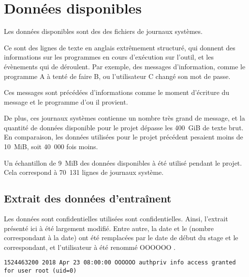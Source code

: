 \chapter{Données disponibles}\label{ch:data_papud}
Les données disponibles sont des des fichiers de journaux systèmes.

Ce sont des lignes de texte en anglais extrêmement structuré,
qui donnent des informations sur les programmes en cours d'exécution sur l'outil, et les évènements qui de déroulent.
Par exemple, des messages d'information, comme \og le programme A à tenté de faire B\fg{}, ou \og l'utilisateur C changé son mot de passe\fg{}.

Ces messages sont précédées d'informations comme le moment d'écriture du message et le programme d'ou il provient.

De plus, ces journaux systèmes contienne un nombre très grand de message, et la quantité de données disponible pour le projet dépasse les 400~GiB de texte brut. En comparaison, les données utilisées pour le projet précédent pesaient moins de 10~MiB, soit 40~000 fois moins.

Un échantillon de 9~MiB des données disponibles à été utilisé pendant le projet.
Cela correspond à 70~131 lignes de journaux système.

\section{Extrait des données d'entraînent}%
Les données sont confidentielles utilisées sont confidentielles.
Ainsi, l'extrait présenté ici à été largement modifié.
Entre autre, la date et le  (nombre correspondant à la date) ont été remplacées par le date de début du stage et le  correspondant, et l'utilisateur à été renommé \og OOOOOO \fg{}.

\begin{lstlisting}[caption={[Exemple d'une ligne extraite des journaux systèmes.]Exemple d'une ligne extraite des journaux systèmes. On à ici dans de gauche à droite~: le \foreign{timestamp}, la date, l'heure, l'utilisateur (OOOOOO), le processus (authpriv), le type de message (info), et le message.}]
	1524463200 2018 Apr 23 08:00:00 OOOOOO authpriv info access granted for user root (uid=0)
\end{lstlisting}


